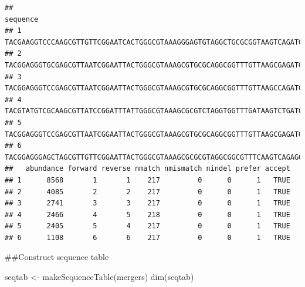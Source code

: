\documentclass[
]{article}
\newenvironment{Shaded}{\begin{snugshade}}{\end{snugshade}}
\newcommand{\FunctionTok}[1]{\textcolor[rgb]{0.00,0.00,0.00}{#1}}
\newcommand{\NormalTok}[1]{#1}
\newcommand{\OtherTok}[1]{\textcolor[rgb]{0.56,0.35,0.01}{#1}}
\begin{document}
\begin{verbatim}
##                                                                                                                                                                                                                                                        sequence
## 1 TACGAAGGTCCCAAGCGTTGTTCGGAATCACTGGGCGTAAAGGGAGTGTAGGCTGCGCGGTAAGTCAGATGTGAAATCCCAGGGCTCAACCCTGGAACTGCATCCGATACTGCCGCGCTAGAGTAATGGAGAGGTAACTGGAATTCTCAGTGTAGCAGTGAAATGCGTAGATATTGAGAGGAAGACCAATGGCGAAAGCAGGTTACTGGACATTTACTGACGCTGAGACTCGAAGGCTAGGGTAGCGAAAGGG
## 2 TACGGAGGGTGCGAGCGTTAATCGGAATTACTGGGCGTAAAGCGTGCGCAGGCGGTTTGTTAAGCGAGATGTGAAAGCCCCGGGCTCAACCTGGGAACTGCATTTTGAACTGGCAAACTAGAGTCTTGTAGAGGGGGGTAGAATTCCAGGTGTAGCGGTGAAATGCGTAGAGATCTGGAGGAATACCGGTGGCGAAGGCGGCCCCCTGGACAAAGACTGACGCTCATGCACGAAAGCGTGGGGAGCAAACAGG
## 3 TACGGAGGGTCCGAGCGTTAATCGGAATTACTGGGCGTAAAGCGTGCGCAGGCGGTTTGTTAAGCCAGATGTGAAATCCCCGGGCTCAACCTGGGAATTGCATTTGGAACTGGCGAACTAGAGTCTTGTAGAGGGGGGTAGAATTCCAGGTGTAGCGGTGAAATGCGTAGATATCTGGAGGAATACCGGTGGCGAAGGCGGCCCCCTGGACAAAGACTGACGCTCATGCACGAAAGCGTGGGGAGCAAACAGG
## 4  TACGTATGTCGCAAGCGTTATCCGGATTTATTGGGCGTAAAGCGCGTCTAGGTGGTTTGATAAGTCTGATGTGAAAATGCGGAGCTCAACTCCGTATTGCGTTGGAAACTGCCAAACTAGAGTATCGGAGAGGTGGGCGGAACTACAAGTGTAGAGGTGAAATTCGTAGATATTTGTAGGAATGCCGATAGAGAAGTCAGCTCACTGGACGAATACTGACACTGAAGCGCGAAAGCATGGGGAGCAAACAGG
## 5 TACGGAGGGTCCGAGCGTTAATCGGAATTACTGGGCGTAAAGCGTGCGCAGGCGGTTTGTTAAGCGAGATGTGAAAGCCCCGGGCTCAACCTGGGAATTGCATTTCGAACTGGCGAACTAGAGTCTTGTAGAGGGGGGTAGAATTCCAGGTGTAGCGGTGAAATGCGTAGAGATCTGGAGGAATACCGGTGGCGAAGGCGGCCCCCTGGACAAAGACTGACGCTCAGGCACGAAAGCGTGGGGAGCAAACAGG
## 6 TACGGAGGGAGCTAGCGTTGTTCGGAATTACTGGGCGTAAAGCGCGCGTAGGCGGCGTTTCAAGTCAGAGGTGAAAGCCTGGAGCTCAACTCCAGAACTGCCTTTGAAACTAGAACGCTAGAATCTTGGAGAGGTCAGTGGAATTCCGAGTGTAGAGGTGAAATTCGTAGATATTCGGAAGAACACCAGTGGCGAAGGCGACTGACTGGACAAGTATTGACGCTGAGGTGCGAAAGCGTGGGGAGCAAACAGG
##   abundance forward reverse nmatch nmismatch nindel prefer accept
## 1      8568       1       1    217         0      0      1   TRUE
## 2      4085       2       2    217         0      0      1   TRUE
## 3      2741       3       3    217         0      0      1   TRUE
## 4      2466       4       5    218         0      0      1   TRUE
## 5      2405       5       4    217         0      0      1   TRUE
## 6      1108       6       6    217         0      0      1   TRUE
\end{verbatim}

\#\#Construct sequence table

\begin{Shaded}
\begin{Highlighting}[]
\NormalTok{seqtab }\OtherTok{\textless{}{-}} \FunctionTok{makeSequenceTable}\NormalTok{(mergers)}
\FunctionTok{dim}\NormalTok{(seqtab)}
\end{Highlighting}
\end{Shaded}
\end{document}
